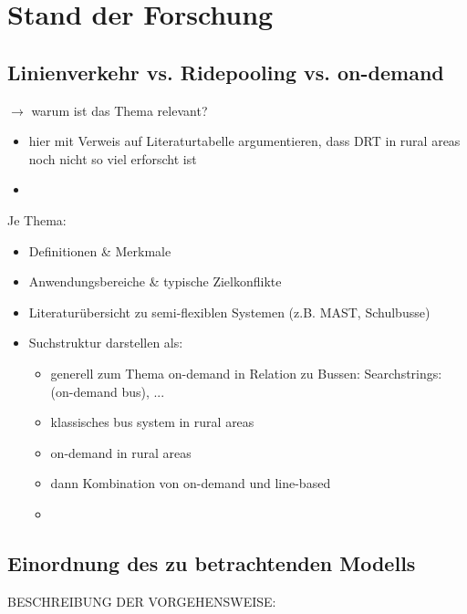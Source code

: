 \chapter{Stand der Forschung}
\section{Linienverkehr vs. Ridepooling vs. on-demand}

$\rightarrow$ warum ist das Thema relevant?
\begin{itemize}
    \item hier mit Verweis auf Literaturtabelle argumentieren, dass DRT in rural areas noch nicht so viel erforscht ist
    \item 
\end{itemize}

Je Thema:
\begin{itemize}
    \item Definitionen \& Merkmale
    \item Anwendungsbereiche \& typische Zielkonflikte
    \item Literaturübersicht zu semi-flexiblen Systemen (z.B. MAST, Schulbusse)
    \item Suchstruktur darstellen als:
    \begin{itemize}
        \item generell zum Thema on-demand in Relation zu Bussen: Searchstrings: (on-demand bus), ...
        \item klassisches bus system in rural areas
        \item on-demand in rural areas
        \item dann Kombination von on-demand und line-based
        
        
        \item 
    \end{itemize}
\end{itemize}



\section{Einordnung des zu betrachtenden Modells}



BESCHREIBUNG DER VORGEHENSWEISE:


